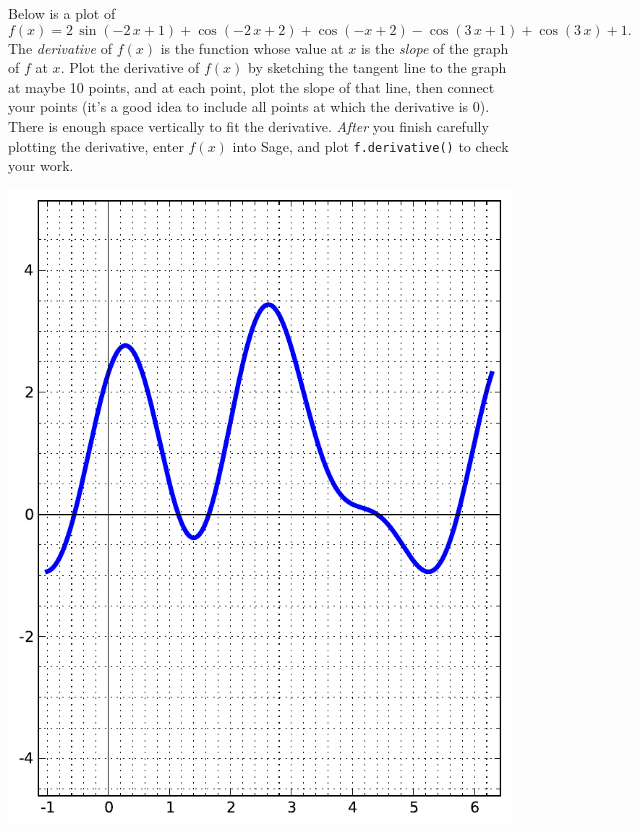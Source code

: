 Below is a plot of $$f(x)=2 \, \sin\left(-2 \, x + 1\right) + \cos\left(-2 \, x + 2\right) + \cos\left(-x + 2\right) - \cos\left(3 \, x + 1\right) + \cos\left(3 \, x\right) + 1.$$  The {\em \color{red}derivative} of $f(x)$ is the function whose value at $x$ is the {\em slope} of the graph of $f$ at $x$.  Plot the derivative of $f(x)$ by sketching the tangent line to the graph at maybe 10 points, and at each point, plot the slope of that line, then connect your points (it's a good idea to include all points at which the derivative is 0).  There is enough space vertically to fit the derivative.  {\em After} you finish carefully plotting the derivative, enter $f(x)$ into Sage, and plot {\color{blue}\verb|f.derivative()|} to check your work.
\begin{center}\includegraphics{functions/99.pdf}\end{center}\newpage

